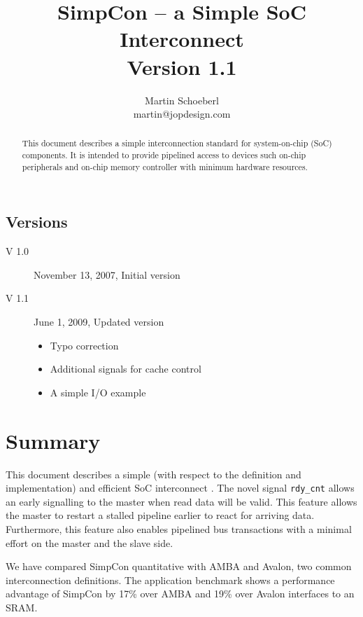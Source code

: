 \documentclass[a4paper,12pt]{scrartcl}
\newcommand{\sign}[1]{{\texttt{#1}}}
\begin{document}
\title{SimpCon -- a Simple SoC Interconnect\\Version 1.1}
\author{Martin Schoeberl\\ martin@jopdesign.com}
\maketitle \thispagestyle{empty}

\begin{abstract}
This document describes a simple interconnection standard for
system-on-chip (SoC) components. It is intended to provide pipelined
access to devices such on-chip peripherals and on-chip memory
controller with minimum hardware resources.
\end{abstract}

\subsection*{Versions}

\begin{description}
  \item[V 1.0] November 13, 2007, Initial version
  \item[V 1.1] June 1, 2009, Updated version
  \begin{itemize}
    \item Typo correction
    \item Additional signals for cache control
    \item A simple I/O example
  \end{itemize}
\end{description}



\section{Summary}

This document describes a simple (with respect to the definition and
implementation) and efficient SoC interconnect \cite{simpcon}. The
novel signal \sign{rdy\_cnt} allows an early signalling to the master
when read data will be valid. This feature allows the master to
restart a stalled pipeline earlier to react for arriving data.
Furthermore, this feature also enables pipelined bus transactions
with a minimal effort on the master and the slave side.

We have compared SimpCon quantitative with AMBA and Avalon, two
common interconnection definitions. The application benchmark shows a
performance advantage of SimpCon by 17\% over AMBA and 19\% over
Avalon interfaces to an SRAM.
\end{document}
